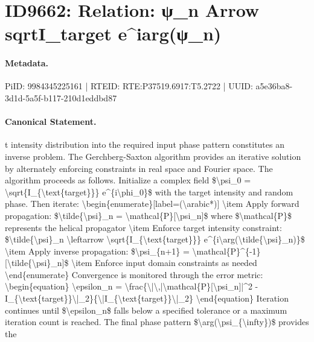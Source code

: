 \section*{ID9662: Relation: ψ\_n Arrow sqrtI\_target e\textasciicircum{}iarg(ψ\_n)}
\paragraph{Metadata.}
PiID: 9984345225161 | RTEID: RTE:P37519.6917:T5.2722 | UUID: a5e36ba8-3d1d-5a5f-b117-210d1eddbd87

\paragraph{Canonical Statement.}
t intensity distribution into the required input phase pattern constitutes an inverse problem. The Gerchberg-Saxton algorithm provides an iterative solution by alternately enforcing constraints in real space and Fourier space. The algorithm proceeds as follows. Initialize a complex field \$\textbackslash{}psi\_0 = \textbackslash{}sqrt\{I\_\{\textbackslash{}text\{target\}\}\} e\textasciicircum{}\{i\textbackslash{}phi\_0\}\$ with the target intensity and random phase. Then iterate: \textbackslash{}begin\{enumerate\}[label=(\textbackslash{}arabic*)] \textbackslash{}item Apply forward propagation: \$\textbackslash{}tilde\{\textbackslash{}psi\}\_n = \textbackslash{}mathcal\{P\}[\textbackslash{}psi\_n]\$ where \$\textbackslash{}mathcal\{P\}\$ represents the helical propagator \textbackslash{}item Enforce target intensity constraint: \$\textbackslash{}tilde\{\textbackslash{}psi\}\_n \textbackslash{}leftarrow \textbackslash{}sqrt\{I\_\{\textbackslash{}text\{target\}\}\} e\textasciicircum{}\{i\textbackslash{}arg(\textbackslash{}tilde\{\textbackslash{}psi\}\_n)\}\$ \textbackslash{}item Apply inverse propagation: \$\textbackslash{}psi\_\{n+1\} = \textbackslash{}mathcal\{P\}\textasciicircum{}\{-1\}[\textbackslash{}tilde\{\textbackslash{}psi\}\_n]\$ \textbackslash{}item Enforce input domain constraints as needed \textbackslash{}end\{enumerate\} Convergence is monitored through the error metric: \textbackslash{}begin\{equation\} \textbackslash{}epsilon\_n = \textbackslash{}frac\{\textbackslash{}|\textbackslash{},|\textbackslash{}mathcal\{P\}[\textbackslash{}psi\_n]|\textasciicircum{}2 - I\_\{\textbackslash{}text\{target\}\}\textbackslash{}|\_2\}\{\textbackslash{}|I\_\{\textbackslash{}text\{target\}\}\textbackslash{}|\_2\} \textbackslash{}end\{equation\} Iteration continues until \$\textbackslash{}epsilon\_n\$ falls below a specified tolerance or a maximum iteration count is reached. The final phase pattern \$\textbackslash{}arg(\textbackslash{}psi\_\{\textbackslash{}infty\})\$ provides the

